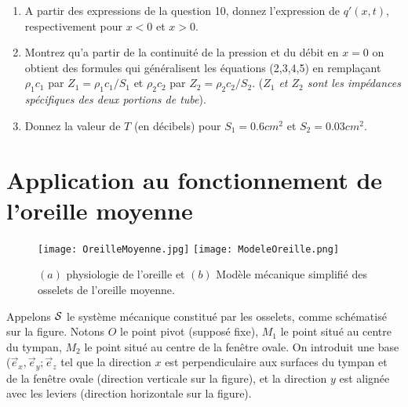 \documentclass[10pt, a4paper]{article}
\newcommand{\question}[1]{}
\begin{document}
\begin{enumerate}
{\begin{enumerate}
\item A partir des expressions de la question 10, donnez  l'expression de $q'(x,t)$, respectivement  pour $x<0$ et $x>0$.

\item
Montrez qu'a partir de la continuité de la pression et du débit en $x=0$ on obtient des formules qui généralisent les équations (2,3,4,5) %
en remplaçant $\rho_1 c_1$ par $Z_1 = \rho_1 c_1/S_1$ et  $\rho_2 c_2$ par $Z_2 = \rho_2 c_2/S_2$. ({\em $Z_1$ et $Z_2$ sont les impédances spécifiques des deux portions de tube}).
\item

Donnez la valeur de $T$ (en décibels) pour $S_1 = 0.6 cm^2$ et $S_2= 0.03 cm^2$.

\end{enumerate}
}

\section{Application au fonctionnement de l'oreille moyenne}

\begin{figure}
\texttt{[image: OreilleMoyenne.jpg]}
\texttt{[image: ModeleOreille.png]}
\caption{$(a)$ physiologie de l'oreille et $(b)$ Modèle mécanique simplifié des osselets de l'oreille moyenne.}
\end{figure}
\question{
Le rôle de l'oreille moyenne est d'optimiser la transmission des ondes acoustiques entre un milieu aérien (le conduit auditif) et un milieu aqueux (la cochlée ou oreille interne).
Pour cela, la solution sélectionnée par la sélection naturelle a consisté à utiliser 3 osselets constituant une sorte de levier reliant ces deux milieux. 
La figure ci-dessus représente ce modèle mécanique de manière très schématique.

On donne les dimensions des bras de levier : $d_1 = 1,3cm$, $d_2 = 1cm$, 
ainsi que la surface du tympan $S_1 = 0.6cm^2$ et celle de la fenêtre ovale $S_2= 0.03cm^2$.
}


Appelons $\cal S$ le système mécanique constitué par les osselets, comme schématisé sur la figure. Notons $O$ le point pivot (supposé fixe), $M_1$ le point situé au centre du tympan,
$M_2$ le point situé au centre de la fenêtre ovale. On introduit une base ($\vec{e}_x,\vec{e}_y;\vec{e}_z$ tel que la direction $x$ est perpendiculaire aux surfaces du tympan et de la fenêtre ovale (direction verticale sur la figure), et la direction $y$ est alignée avec les leviers (direction horizontale sur la figure). 
 

\end{enumerate}
\end{document}
